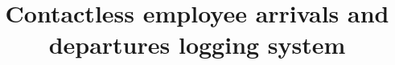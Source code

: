 \documentclass[]{tukediphc}
\title{Contactless employee arrivals and departures logging system}
\providecommand{\abstraktsk}{}
\providecommand{\abstrakteng}{}
\providecommand{\kabstrakt}{}
\providecommand{\zadanieprace}{}
\providecommand{\cestnevyhlasenie}{}
\providecommand{\podakovanie}{}
\providecommand{\kpodakovania}{}
\begin{document}
\renewcommand{\figurename}{Obrázok}	
\makeatletter
{}
\makeatother
\renewcommand{\thefigure}{\thesection.\arabic{figure}}
\renewcommand\theHfigure{\theHsection.\arabic{figure}}
\renewcommand\theHtable{\theHsection.\arabic{table}}


\prvastrana




%
%


\abstrakteng %

\kabstrakt %

\zadanieprace

\cestnevyhlasenie

%
%
\end{document}

